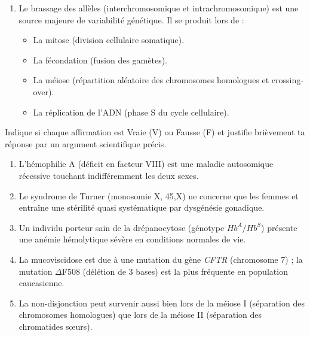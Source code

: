 \documentclass[11pt]{article}
\begin{document}
\begin{exercice}
\begin{enumerate}
\begin{itemize}
    \end{itemize}
    \item Le brassage des allèles (interchromosomique et intrachromosomique) est une source majeure de variabilité génétique. Il se produit lors de :
    \begin{itemize}
        \item[A.] La mitose (division cellulaire somatique).
        \item[B.] La fécondation (fusion des gamètes).
        \item[C.] La méiose (répartition aléatoire des chromosomes homologues et crossing-over).
        \item[D.] La réplication de l'ADN (phase S du cycle cellulaire).
    \end{itemize}
\end{enumerate}
\end{exercice}

\begin{exercice}
Indique si chaque affirmation est Vraie (V) ou Fausse (F) et justifie brièvement ta réponse par un argument scientifique précis.
\begin{enumerate}
    \item L'hémophilie A (déficit en facteur VIII) est une maladie autosomique récessive touchant indifféremment les deux sexes.
    \item Le syndrome de Turner (monosomie X, 45,X) ne concerne que les femmes et entraîne une stérilité quasi systématique par dysgénésie gonadique.
    \item Un individu porteur sain de la drépanocytose (génotype $Hb^A/Hb^S$) présente une anémie hémolytique sévère en conditions normales de vie.
    \item La mucoviscidose est due à une mutation du gène \emph{CFTR} (chromosome 7) ; la mutation $\Delta$F508 (délétion de 3 bases) est la plus fréquente en population caucasienne.
    \item La non-disjonction peut survenir aussi bien lors de la méiose I (séparation des chromosomes homologues) que lors de la méiose II (séparation des chromatides sœurs).
\end{enumerate}
\end{exercice}
\end{document}
